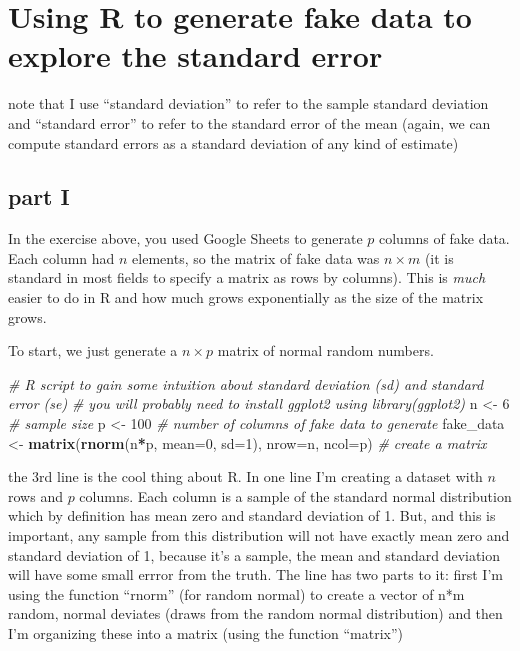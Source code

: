 \documentclass[]{book}
\newenvironment{Shaded}{\begin{snugshade}}{\end{snugshade}}
\newcommand{\CommentTok}[1]{\textcolor[rgb]{0.56,0.35,0.01}{\textit{#1}}}
\newcommand{\DataTypeTok}[1]{\textcolor[rgb]{0.13,0.29,0.53}{#1}}
\newcommand{\DecValTok}[1]{\textcolor[rgb]{0.00,0.00,0.81}{#1}}
\newcommand{\KeywordTok}[1]{\textcolor[rgb]{0.13,0.29,0.53}{\textbf{#1}}}
\newcommand{\NormalTok}[1]{#1}
\newcommand{\OperatorTok}[1]{\textcolor[rgb]{0.81,0.36,0.00}{\textbf{#1}}}
\newcommand{\StringTok}[1]{\textcolor[rgb]{0.31,0.60,0.02}{#1}}
\begin{document}
\hypertarget{using-r-to-generate-fake-data-to-explore-the-standard-error}{%
\section{Using R to generate fake data to explore the standard error}\label{using-r-to-generate-fake-data-to-explore-the-standard-error}}

note that I use ``standard deviation'' to refer to the sample standard deviation and ``standard error'' to refer to the standard error of the mean (again, we can compute standard errors as a standard deviation of any kind of estimate)

\hypertarget{part-i}{%
\subsection{part I}\label{part-i}}

In the exercise above, you used Google Sheets to generate \(p\) columns of fake data. Each column had \(n\) elements, so the matrix of fake data was \(n \times m\) (it is standard in most fields to specify a matrix as rows by columns). This is \emph{much} easier to do in R and how much grows exponentially as the size of the matrix grows.

To start, we just generate a \(n \times p\) matrix of normal random numbers.

\begin{Shaded}
\begin{Highlighting}[]
\CommentTok{# R script to gain some intuition about standard deviation (sd) and standard error (se)}
\CommentTok{# you will probably need to install ggplot2 using library(ggplot2) }
\NormalTok{n <-}\StringTok{ }\DecValTok{6} \CommentTok{# sample size}
\NormalTok{p <-}\StringTok{ }\DecValTok{100} \CommentTok{# number of columns of fake data to generate}
\NormalTok{fake_data <-}\StringTok{ }\KeywordTok{matrix}\NormalTok{(}\KeywordTok{rnorm}\NormalTok{(n}\OperatorTok{*}\NormalTok{p, }\DataTypeTok{mean=}\DecValTok{0}\NormalTok{, }\DataTypeTok{sd=}\DecValTok{1}\NormalTok{), }\DataTypeTok{nrow=}\NormalTok{n, }\DataTypeTok{ncol=}\NormalTok{p) }\CommentTok{# create a matrix}
\end{Highlighting}
\end{Shaded}

the 3rd line is the cool thing about R. In one line I'm creating a dataset with \(n\) rows and \(p\) columns. Each column is a sample of the standard normal distribution which by definition has mean zero and standard deviation of 1. But, and this is important, any sample from this distribution will not have exactly mean zero and standard deviation of 1, because it's a sample, the mean and standard deviation will have some small errror from the truth. The line has two parts to it: first I'm using the function ``rnorm'' (for random normal) to create a vector of n*m random, normal deviates (draws from the random normal distribution) and then I'm organizing these into a matrix (using the function ``matrix'')
\end{document}
